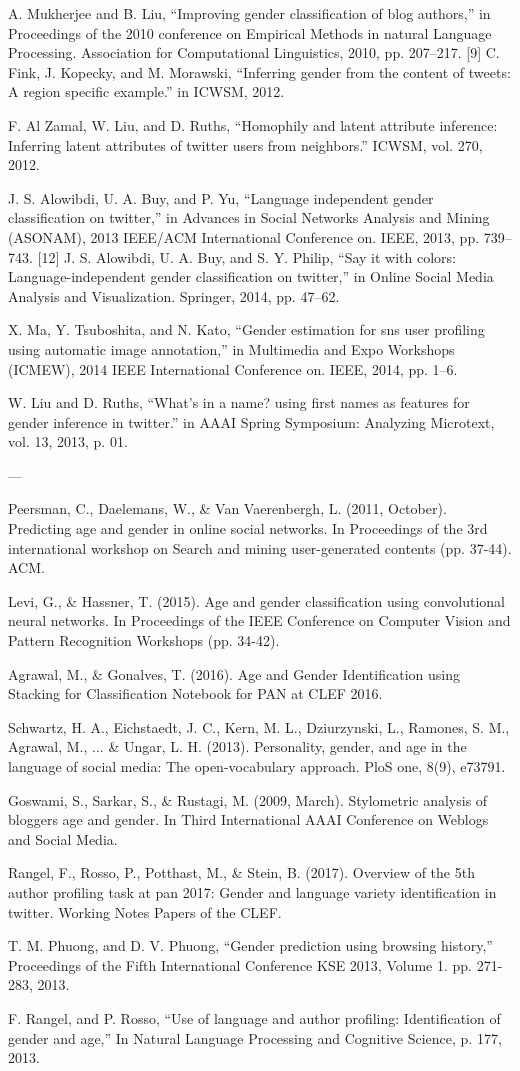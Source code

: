 \documentclass{article}
\begin{document}
A. Mukherjee and B. Liu, “Improving gender classification of blog authors,” in Proceedings of the 2010 conference on Empirical Methods in natural Language Processing. Association for Computational Linguistics, 2010, pp. 207–217. [9] C. Fink, J. Kopecky, and M. Morawski, “Inferring gender from the content of tweets: A region specific example.” in ICWSM, 2012.

F. Al Zamal, W. Liu, and D. Ruths, “Homophily and latent attribute inference: Inferring latent attributes of twitter users from neighbors.” ICWSM, vol. 270, 2012.

J. S. Alowibdi, U. A. Buy, and P. Yu, “Language independent gender classification on twitter,” in Advances in Social Networks Analysis and Mining (ASONAM), 2013 IEEE/ACM International Conference on. IEEE, 2013, pp. 739–743. [12] J. S. Alowibdi, U. A. Buy, and S. Y. Philip, “Say it with colors: Language-independent gender classification on twitter,” in Online Social Media Analysis and Visualization. Springer, 2014, pp. 47–62.

X. Ma, Y. Tsuboshita, and N. Kato, “Gender estimation for sns user profiling using automatic image annotation,” in Multimedia and Expo Workshops (ICMEW), 2014 IEEE International Conference on. IEEE, 2014, pp. 1–6.

W. Liu and D. Ruths, “What’s in a name? using first names as features for gender inference in twitter.” in AAAI Spring Symposium: Analyzing Microtext, vol. 13, 2013, p. 01.

---

Peersman, C., Daelemans, W., & Van Vaerenbergh, L. (2011, October). Predicting age and gender in online social networks. In Proceedings of the 3rd international workshop on Search and mining user-generated contents (pp. 37-44). ACM.

Levi, G., & Hassner, T. (2015). Age and gender classification using convolutional neural networks. In Proceedings of the IEEE Conference on Computer Vision and Pattern Recognition Workshops (pp. 34-42).

Agrawal, M., & Gonalves, T. (2016). Age and Gender Identification using Stacking for Classification Notebook for PAN at CLEF 2016.

Schwartz, H. A., Eichstaedt, J. C., Kern, M. L., Dziurzynski, L., Ramones, S. M., Agrawal, M., ... & Ungar, L. H. (2013). Personality, gender, and age in the language of social media: The open-vocabulary approach. PloS one, 8(9), e73791.

Goswami, S., Sarkar, S., & Rustagi, M. (2009, March). Stylometric analysis of bloggers age and gender. In Third International AAAI Conference on Weblogs and Social Media.

Rangel, F., Rosso, P., Potthast, M., & Stein, B. (2017). Overview of the 5th author profiling task at pan 2017: Gender and language variety identification in twitter. Working Notes Papers of the CLEF.

T. M. Phuong, and D. V. Phuong, “Gender prediction using browsing history,” Proceedings of the Fifth International Conference KSE 2013, Volume 1. pp. 271-283, 2013.

F. Rangel, and P. Rosso, “Use of language and author profiling: Identification of gender and age,” In Natural Language Processing and Cognitive Science, p. 177, 2013.
\end{document}
